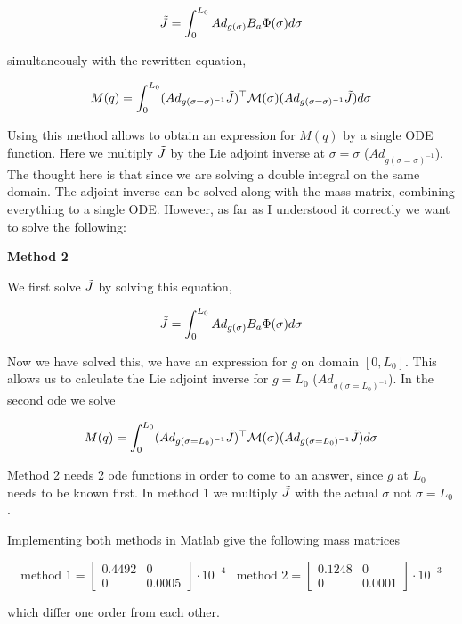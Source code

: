 \begin{equation}
    \Tilde{J} = \int_0^{L_0} Ad_{g(\sigma)} B_a \Phi(\sigma) d\sigma
\end{equation}

simultaneously with the rewritten equation,

\begin{equation}
    M(q) = \int_0^{L_0} (Ad_{g(\sigma = \sigma)^{-1}} \Tilde{J})^\top \mathcal{M}(\sigma) (Ad_{g(\sigma = \sigma)^{-1}} \Tilde{J}) d \sigma
\end{equation}

Using this method allows to obtain an expression for $M(q)$ by a single ODE function. Here we multiply $\Tilde{J}$ by the Lie adjoint inverse at $\sigma = \sigma$ ($Ad_{g(\sigma = \sigma)^{-1}}$). The thought here is that since we are solving a double integral on the same domain. The adjoint inverse can be solved along with the mass matrix, combining everything to a single ODE. However, as far as I understood it correctly we want to solve the following:

\textbf{Method 2}

We first solve $\Tilde{J}$ by solving this equation,

\begin{equation}
    \Tilde{J} = \int_0^{L_0} Ad_{g(\sigma)} B_a \Phi(\sigma) d\sigma
\end{equation}

Now we have solved this, we have an expression for $g$ on domain $[0,L_0]$. This allows us to calculate the Lie adjoint inverse for $g = L_0$ ($Ad_{g(\sigma = L_0)^{-1}}$). In the second ode we solve

\begin{equation}
    M(q) = \int_0^{L_0} (Ad_{g(\sigma = L_0)^{-1}} \Tilde{J})^\top \mathcal{M}(\sigma) (Ad_{g(\sigma = L_0)^{-1}} \Tilde{J}) d \sigma
\end{equation}

Method 2 needs 2 ode functions in order to come to an answer, since $g$ at $L_0$ needs to be known first. In method 1 we multiply $\Tilde{J}$ with the actual $\sigma$ not $\sigma = L_0$.

Implementing both methods in Matlab give the following mass matrices

\begin{equation}
    \text{method 1} = \begin{bmatrix} 0.4492 & 0 \\ 0 & 0.0005 \end{bmatrix} \cdot 10^{-4}  \hspace{10pt}      \text{method 2} = \begin{bmatrix} 0.1248 & 0 \\ 0 & 0.0001 \end{bmatrix} \cdot 10^{-3}
\end{equation}

which differ one order from each other.



